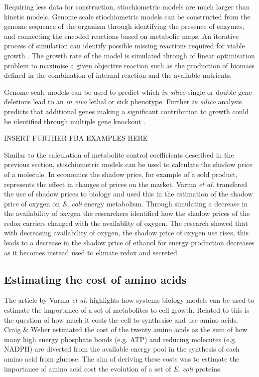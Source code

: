 Requiring less data for construction, stiochiometric models are much larger than kinetic models. Genome scale stiochiometric models can be constructed from the genome sequence of the organism through identifying the presence of enzymes, and connecting the encoded reactions based on metabolic maps. An iterative process of simulation can identify possible missing reactions required for viable growth \cite{genome_model_construction}. The growth rate of the model is simulated through of linear optimisation problem to maximise a given objective reaction such as the production of biomass defined in the combination of internal reaction and the available nutrients.

Genome scale models can be used to predict which \emph{in silico} single \cite{single_knockout} or double \cite{double_knockout} gene deletions lead to an \emph{in vivo} lethal or sick phenotype. Further \emph{in silico} analysis predicts that additional genes making a significant contribution to growth could be identified through multiple gene knockout \cite{deutscher2008}.

INSERT FURTHER FBA EXAMPLES HERE

Similar to the calculation of metabolite control coefficients described in the previous section, stoichiometric models can be used to calculate the shadow price of a molecule. In economics the shadow price, for example of a sold product, represents the effect in changes of prices on the market. Varma \emph{et al.} \cite{varma1993} transfered the use of shadow prices to biology and used this in the estimation of the shadow price of oxygen on \emph{E. coli} energy metabolism. Through simulating a decrease in the availability of oxygen the researchers identified how the shadow prices of the redox carriers changed with the availablity of oxygen. The research showed that with decreasing availability of oxygen, the shadow price of oxygen use rises, this leads to a decrease in the shadow price of ethanol for energy production decreases as it becomes instead used to elimate redox and secreted.

\subsection{Estimating the cost of amino acids}

The article by Varma \emph{et al.} highlights how systems biology models can be used to estimate the importance of a set of metabolites to cell growth. Related to this is the question of how much it costs the cell to synthesise and use amino acids. Craig \& Weber \cite{craig1998} estimated the cost of the twenty amino acids as the sum of how many high energy phosphate bonds (e.g. ATP) and reducing molecutes (e.g. NADPH) are diverted from the available energy pool in the synthesis of each amino acid from glucose. The aim of deriving these costs was to estimate the importance of amino acid cost the evolution of a set of \emph{E. coli} proteins.

